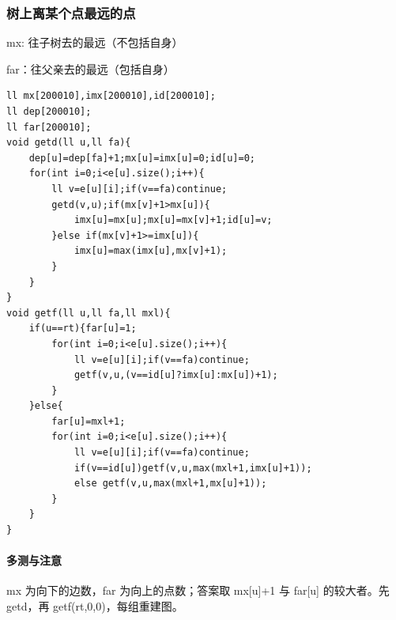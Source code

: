 \subsubsection{树上离某个点最远的点}
mx: 往子树去的最远（不包括自身）

far：往父亲去的最远（包括自身）
\begin{lstlisting}
ll mx[200010],imx[200010],id[200010];
ll dep[200010];
ll far[200010];
void getd(ll u,ll fa){
    dep[u]=dep[fa]+1;mx[u]=imx[u]=0;id[u]=0;
    for(int i=0;i<e[u].size();i++){
        ll v=e[u][i];if(v==fa)continue;
        getd(v,u);if(mx[v]+1>mx[u]){
            imx[u]=mx[u];mx[u]=mx[v]+1;id[u]=v;
        }else if(mx[v]+1>=imx[u]){
            imx[u]=max(imx[u],mx[v]+1);
        }
    }
}
void getf(ll u,ll fa,ll mxl){
    if(u==rt){far[u]=1;
        for(int i=0;i<e[u].size();i++){
            ll v=e[u][i];if(v==fa)continue;
            getf(v,u,(v==id[u]?imx[u]:mx[u])+1);
        }
    }else{
        far[u]=mxl+1;
        for(int i=0;i<e[u].size();i++){
            ll v=e[u][i];if(v==fa)continue;
            if(v==id[u])getf(v,u,max(mxl+1,imx[u]+1));
            else getf(v,u,max(mxl+1,mx[u]+1));
        }
    }
}
\end{lstlisting}

\paragraph{多测与注意} mx 为向下的边数，far 为向上的点数；答案取 mx[u]+1 与 far[u] 的较大者。先 getd，再 getf(rt,0,0)，每组重建图。
